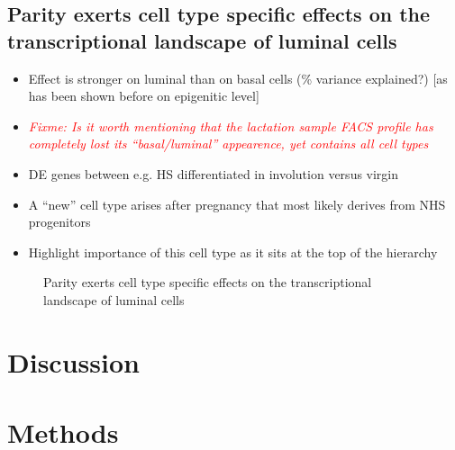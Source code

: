 \documentclass[oneside]{amsart}
\newcommand{\fixme}[1]{\textit{\textcolor{red}{Fixme: #1}}}
\begin{document}
\newpage
\subsection{Parity exerts cell type specific effects on the transcriptional landscape of luminal cells\label{sec:ParityEffect}}
\begin{itemize}
    \item Effect is stronger on luminal than on basal cells (\% variance explained?) [as has been shown before on epigenitic level]
    \item \fixme{Is it worth mentioning that the lactation sample FACS profile has completely lost its ``basal/luminal'' appearence, yet contains all cell types}
    \item DE genes between e.g. HS differentiated in involution versus virgin
    \item A ``new'' cell type arises after pregnancy that most likely derives from NHS progenitors 
    \item Highlight importance of this cell type as it sits at the top of the hierarchy
\end{itemize}


\begin{figure}[h]
\begin{subfigure}{0.45\linewidth}
\centering %
\caption{}
\end{subfigure}
\begin{subfigure}{0.45\linewidth}
\caption{}
\end{subfigure}
\begin{subfigure}{0.45\linewidth}
\centering %
\caption{}
\end{subfigure}
\caption{Parity exerts cell type specific effects on the transcriptional landscape of luminal cells}
      \label{fig:f3}
  \end{figure}

\section{Discussion}
\section{Methods}

\clearpage




\end{document}
